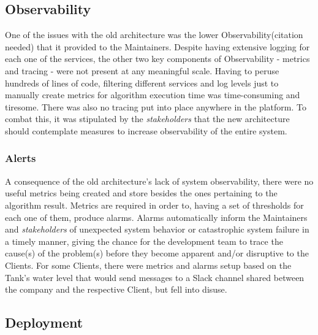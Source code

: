 \subsection{Observability}\label{methodology:ss:observability}

One of the issues with the old architecture was the lower Observability(citation needed) that it provided to the Maintainers. Despite having extensive logging for each one of the services, the other two key components of Observability - metrics and tracing - were not present at any meaningful scale. Having to peruse hundreds of lines of code, filtering different services and log levels just to manually create metrics for algorithm execution time was time-consuming and tiresome. There was also no tracing put into place anywhere in the platform. To combat this, it was stipulated by the \textit{stakeholders} that the new architecture should contemplate measures to increase observability of the entire system.

\subsubsection{Alerts}\label{methodology:sss:alerts}
A consequence of the old architecture's lack of system observability, there were no useful metrics being created and store besides the ones pertaining to the algorithm result. Metrics are required in order to, having a set of thresholds for each one of them, produce alarms. Alarms automatically inform the Maintainers and \textit{stakeholders} of unexpected system behavior or catastrophic system failure in a timely manner, giving the chance for the development team to trace the cause(s) of the problem(s) before they become apparent and/or disruptive to the Clients. For some Clients, there were metrics and alarms setup based on the Tank's water level that would send messages to a Slack channel shared between the company and the respective Client, but fell into disuse.



\subsection{Deployment}\label{methodology:ss:deployment}

